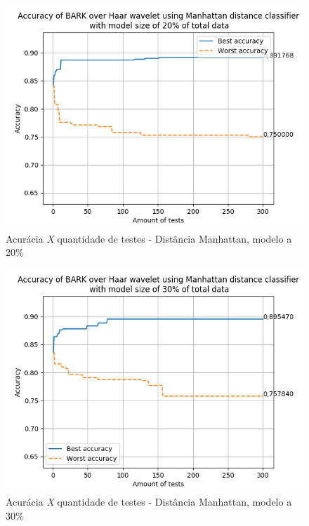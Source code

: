 \begin{myenv}{1.5}
		\newpage
		\begin{figure}[h]
			\centering
			\includegraphics{images/results/confusionMatrices/classifier_Manhattan_20.png}
			\caption{Acurácia \textit{X} quantidade de testes - Distância Manhattan, modelo a 20\%}
			\label{fig:classifiermanhattan20}
		\end{figure}
		

		\newpage
		\begin{figure}[h]
			\centering
			\includegraphics{images/results/confusionMatrices/classifier_Manhattan_30.png}
			\caption{Acurácia \textit{X} quantidade de testes - Distância Manhattan, modelo a 30\%}
			\label{fig:classifiermanhattan30}
		\end{figure}
		
		

\end{myenv}

